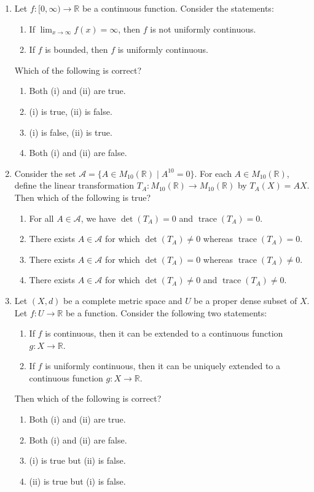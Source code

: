 \documentclass[11pt, a4paper]{article}
\begin{document}
\begin{enumerate}
\item Let $f:[0,\infty)\to\mathbb{R}$ be a continuous function. Consider the statements:
\begin{enumerate}[label=(\roman*)]
\item If $\lim_{x\to\infty}f(x)=\infty$, then $f$ is not uniformly continuous.
\item If $f$ is bounded, then $f$ is uniformly continuous.
\end{enumerate}
Which of the following is correct?
\begin{enumerate}[label=(\alph*)]
\item Both (i) and (ii) are true.
\item (i) is true, (ii) is false.
\item (i) is false, (ii) is true.
\item Both (i) and (ii) are false.
\end{enumerate}

\item Consider the set $\mathcal A=\{A\in M_{10}(\mathbb{R})\mid A^{10}=0\}$. For each $A\in M_{10}(\mathbb{R})$, define the linear transformation $T_A:M_{10}(\mathbb{R})\to M_{10}(\mathbb{R})$ by $T_A(X)=AX$. Then which of the following is true?
\begin{enumerate}[label=(\alph*)]
\item For all $A\in\mathcal A$, we have $\det(T_A)=0$ and $\operatorname{trace}(T_A)=0$.
\item There exists $A\in\mathcal A$ for which $\det(T_A)\neq0$ whereas $\operatorname{trace}(T_A)=0$.
\item There exists $A\in\mathcal A$ for which $\det(T_A)=0$ whereas $\operatorname{trace}(T_A)\neq0$.
\item There exists $A\in\mathcal A$ for which $\det(T_A)\neq0$ and $\operatorname{trace}(T_A)\neq0$.
\end{enumerate}

\item Let $(X,d)$ be a complete metric space and $U$ be a proper dense subset of $X$. Let $f:U\to\mathbb{R}$ be a function. Consider the following two statements:
\begin{enumerate}[label=(\roman*)]
\item If $f$ is continuous, then it can be extended to a continuous function $g:X\to\mathbb{R}$.
\item If $f$ is uniformly continuous, then it can be uniquely extended to a continuous function $g:X\to\mathbb{R}$.
\end{enumerate}
Then which of the following is correct?
\begin{enumerate}[label=(\alph*)]
\item Both (i) and (ii) are true.
\item Both (i) and (ii) are false.
\item (i) is true but (ii) is false.
\item (ii) is true but (i) is false.
\end{enumerate}


\end{enumerate}
\end{document}
